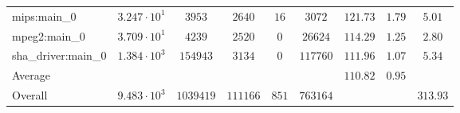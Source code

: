 \begin{tabular}{|l|c|c|c|c|c|c|c|c|}
mips:main\_0            & $ 3.247 \cdot 10^{1} $ & $ 3953    $ & $ 2640   $ & $ 16  $ & $ 3072   $ & $ 121.73      $ & $ 1.79    $ & $ 5.01    $ \\
mpeg2:main\_0           & $ 3.709 \cdot 10^{1} $ & $ 4239    $ & $ 2520   $ & $ 0   $ & $ 26624  $ & $ 114.29      $ & $ 1.25    $ & $ 2.80    $ \\
sha\_driver:main\_0     & $ 1.384 \cdot 10^{3} $ & $ 154943  $ & $ 3134   $ & $ 0   $ & $ 117760 $ & $ 111.96      $ & $ 1.07    $ & $ 5.34    $ \\
\hline
Average                 & $                    $ & $         $ & $        $ & $     $ & $        $ & $ 110.82      $ & $ 0.95    $ & $         $ \\
\hline
Overall                 & $ 9.483 \cdot 10^{3} $ & $ 1039419 $ & $ 111166 $ & $ 851 $ & $ 763164 $ & $             $ & $         $ & $ 313.93  $ \\
\hline
\end{tabular}
